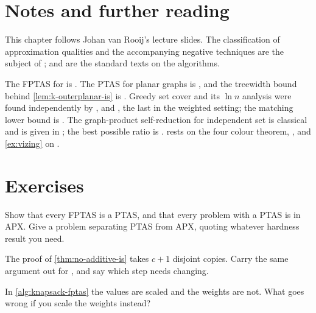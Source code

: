 \section{Notes and further reading}
\label{sec:approx-ii-further-reading}

This chapter follows Johan van Rooij's lecture slides. The classification of
approximation qualities and the accompanying negative techniques are the
subject of \citet[Chapter~3]{Ausiello1999}; \citet{WilliamsonShmoys2011} and
\citet{Vazirani2001} are the standard texts on the algorithms.

The FPTAS for  is \citet{IbarraKim1975}. The PTAS for planar
graphs is \citet{Baker1994}, and the treewidth bound behind
\cref{lem:k-outerplanar-is} is \citet{Bodlaender1988}. Greedy set cover and its
$\ln n$ analysis were found independently by \citet{Johnson1974},
\citet{Lovasz1975} and \citet{Chvatal1979}, the last in the weighted setting;
the matching lower bound is \citet{Feige1998}. The graph-product
self-reduction for independent set is classical and is given in
\citet{GareyJohnson1979}; the best possible ratio is \citet{Zuckerman2007}.  rests on the
four colour theorem, \citet{AppelHaken1977}, and \cref{ex:vizing} on
\citet{Vizing1964}.

\section{Exercises}
\label{sec:ex-approx-ii}

\begin{exercise}
Show that every FPTAS is a PTAS, and that every problem with a PTAS is in
\textrm{APX}. Give a problem separating PTAS from \textrm{APX}, quoting whatever
hardness result you need.
\end{exercise}

\begin{exercise}
The proof of \cref{thm:no-additive-is} takes $c+1$ disjoint copies. Carry the
same argument out for , and say which step needs changing.
\end{exercise}

\begin{exercise}
In \cref{alg:knapsack-fptas} the values are scaled and the weights are not.
What goes wrong if you scale the weights instead?
\end{exercise}

